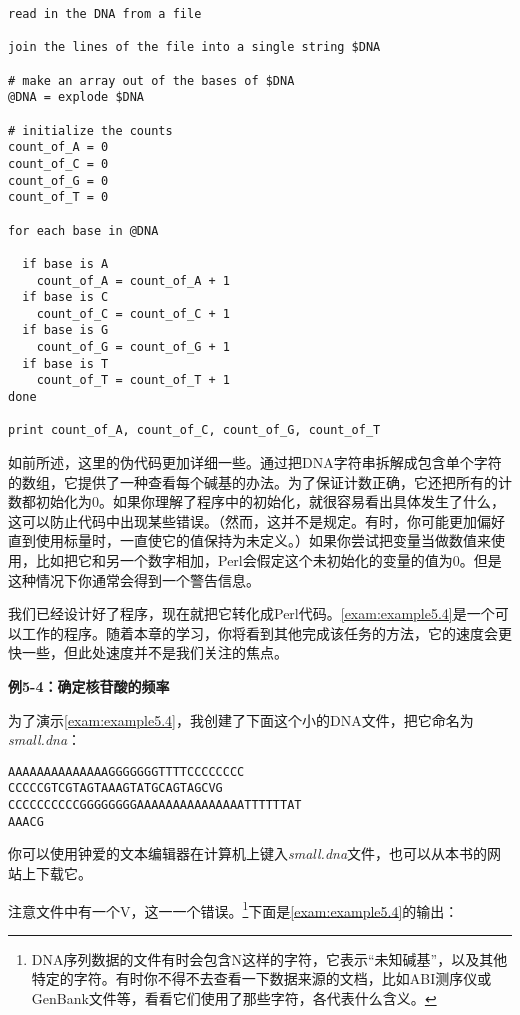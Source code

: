 \begin{lstlisting}
read in the DNA from a file

join the lines of the file into a single string $DNA

# make an array out of the bases of $DNA
@DNA = explode $DNA

# initialize the counts
count_of_A = 0
count_of_C = 0
count_of_G = 0
count_of_T = 0

for each base in @DNA

  if base is A
    count_of_A = count_of_A + 1
  if base is C
    count_of_C = count_of_C + 1
  if base is G
    count_of_G = count_of_G + 1
  if base is T
    count_of_T = count_of_T + 1
done

print count_of_A, count_of_C, count_of_G, count_of_T
\end{lstlisting}

如前所述，这里的伪代码更加详细一些。通过把DNA字符串拆解成包含单个字符的数组，它提供了一种查看每个碱基的办法。为了保证计数正确，它还把所有的计数都初始化为0。如果你理解了程序中的初始化，就很容易看出具体发生了什么，这可以防止代码中出现某些错误。（然而，这并不是规定。有时，你可能更加偏好直到使用标量时，一直使它的值保持为未定义。）如果你尝试把变量当做数值来使用，比如把它和另一个数字相加，Perl会假定这个未初始化的变量的值为0。但是这种情况下你通常会得到一个警告信息。

我们已经设计好了程序，现在就把它转化成Perl代码。\autoref{exam:example5.4}是一个可以工作的程序。随着本章的学习，你将看到其他完成该任务的方法，它的速度会更快一些，但此处速度并不是我们关注的焦点。

\textbf{例5-4：确定核苷酸的频率}


为了演示\autoref{exam:example5.4}，我创建了下面这个小的DNA文件，把它命名为\textit{small.dna}：

\begin{lstlisting}
AAAAAAAAAAAAAAGGGGGGGTTTTCCCCCCCC
CCCCCGTCGTAGTAAAGTATGCAGTAGCVG
CCCCCCCCCCGGGGGGGGAAAAAAAAAAAAAAATTTTTTAT
AAACG
\end{lstlisting}

你可以使用钟爱的文本编辑器在计算机上键入\textit{small.dna}文件，也可以从本书的网站上下载它。

注意文件中有一个V，这一一个错误。\footnote{DNA序列数据的文件有时会包含N这样的字符，它表示“未知碱基”，以及其他特定的字符。有时你不得不去查看一下数据来源的文档，比如ABI测序仪或GenBank文件等，看看它们使用了那些字符，各代表什么含义。}下面是\autoref{exam:example5.4}的输出：


